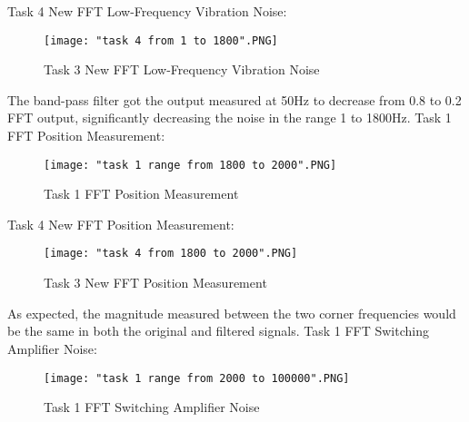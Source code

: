 \documentclass[12pt]{article}
\begin{document}
  Task 4 New FFT Low-Frequency Vibration Noise:
\begin{figure}[H]
\texttt{[image: "task 4 from 1 to 1800".PNG]}
  \caption{Task 3 New FFT Low-Frequency Vibration Noise}
  \end{figure}
The band-pass filter got the output measured at 50Hz to decrease from 0.8 to 0.2 FFT output, significantly decreasing the noise in the range 1 to 1800Hz.
\clearpage 
Task 1 FFT Position Measurement: 
\begin{figure}[H]
\texttt{[image: "task 1 range from 1800 to 2000".PNG]}
  \caption{Task 1 FFT Position Measurement}
  \end{figure}
  
  Task 4 New FFT Position Measurement:
\begin{figure}[H]
\texttt{[image: "task 4 from 1800 to 2000".PNG]}
  \caption{Task 3 New FFT Position Measurement}
  \end{figure}
As expected, the magnitude measured between the two corner frequencies would be the same in both the original and filtered signals.
\clearpage  
Task 1 FFT Switching Amplifier Noise:
\begin{figure}[H]
\texttt{[image: "task 1 range from 2000 to 100000".PNG]}
  \caption{Task 1 FFT Switching Amplifier Noise}
  \end{figure}
  
\end{document}
